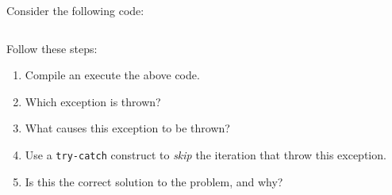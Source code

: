 Consider the following code:
\inputminted{csharp}{\context/question/ArrayIncrementer.cs}

Follow these steps:
\begin{enumerate}
  \item Compile an execute the above code.
  \item Which exception is thrown?
  \item What causes this exception to be thrown?
  \item Use a \texttt{try-catch} construct to \textsl{skip} the iteration that throw this exception.
  \item Is this the correct solution to the problem, and why?
\end{enumerate}

